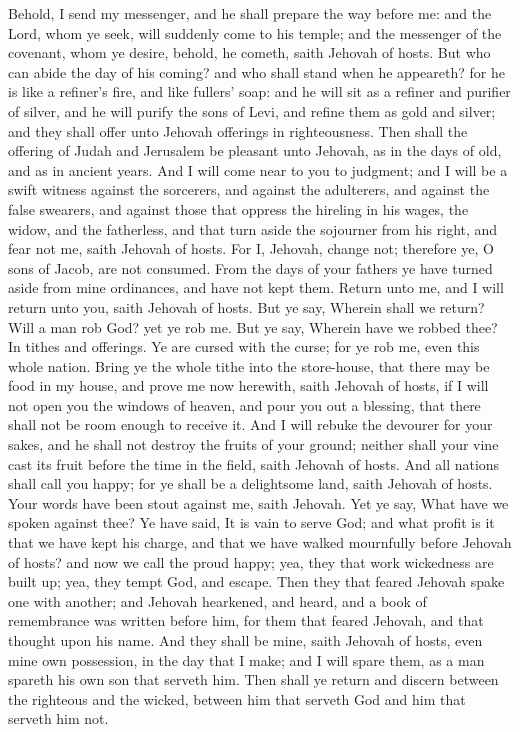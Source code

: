 Behold, I send my messenger, and he shall prepare the way before me: and the Lord, whom ye seek, will suddenly come to his temple; and the messenger of the covenant, whom ye desire, behold, he cometh, saith Jehovah of hosts. But who can abide the day of his coming? and who shall stand when he appeareth? for he is like a refiner’s fire, and like fullers’ soap: and he will sit as a refiner and purifier of silver, and he will purify the sons of Levi, and refine them as gold and silver; and they shall offer unto Jehovah offerings in righteousness. Then shall the offering of Judah and Jerusalem be pleasant unto Jehovah, as in the days of old, and as in ancient years. And I will come near to you to judgment; and I will be a swift witness against the sorcerers, and against the adulterers, and against the false swearers, and against those that oppress the hireling in his wages, the widow, and the fatherless, and that turn aside the sojourner from his right, and fear not me, saith Jehovah of hosts. For I, Jehovah, change not; therefore ye, O sons of Jacob, are not consumed.  From the days of your fathers ye have turned aside from mine ordinances, and have not kept them. Return unto me, and I will return unto you, saith Jehovah of hosts. But ye say, Wherein shall we return? Will a man rob God? yet ye rob me. But ye say, Wherein have we robbed thee? In tithes and offerings. Ye are cursed with the curse; for ye rob me, even this whole nation. Bring ye the whole tithe into the store-house, that there may be food in my house, and prove me now herewith, saith Jehovah of hosts, if I will not open you the windows of heaven, and pour you out a blessing, that there shall not be room enough to receive it. And I will rebuke the devourer for your sakes, and he shall not destroy the fruits of your ground; neither shall your vine cast its fruit before the time in the field, saith Jehovah of hosts. And all nations shall call you happy; for ye shall be a delightsome land, saith Jehovah of hosts.  Your words have been stout against me, saith Jehovah. Yet ye say, What have we spoken against thee? Ye have said, It is vain to serve God; and what profit is it that we have kept his charge, and that we have walked mournfully before Jehovah of hosts? and now we call the proud happy; yea, they that work wickedness are built up; yea, they tempt God, and escape.  Then they that feared Jehovah spake one with another; and Jehovah hearkened, and heard, and a book of remembrance was written before him, for them that feared Jehovah, and that thought upon his name. And they shall be mine, saith Jehovah of hosts, even mine own possession, in the day that I make; and I will spare them, as a man spareth his own son that serveth him. Then shall ye return and discern between the righteous and the wicked, between him that serveth God and him that serveth him not. 

